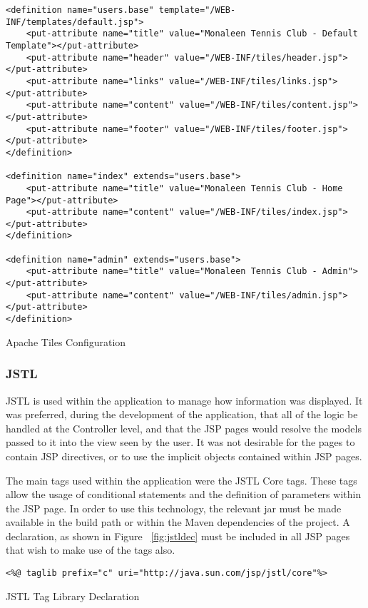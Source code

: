 \begin{table}[H]
\begin{lstlisting}
<definition name="users.base" template="/WEB-INF/templates/default.jsp">
	<put-attribute name="title" value="Monaleen Tennis Club - Default Template"></put-attribute>
	<put-attribute name="header" value="/WEB-INF/tiles/header.jsp"></put-attribute>
	<put-attribute name="links" value="/WEB-INF/tiles/links.jsp"></put-attribute>
	<put-attribute name="content" value="/WEB-INF/tiles/content.jsp"></put-attribute>
	<put-attribute name="footer" value="/WEB-INF/tiles/footer.jsp"></put-attribute>
</definition>

<definition name="index" extends="users.base">
	<put-attribute name="title" value="Monaleen Tennis Club - Home Page"></put-attribute>
	<put-attribute name="content" value="/WEB-INF/tiles/index.jsp"></put-attribute>
</definition>

<definition name="admin" extends="users.base">
	<put-attribute name="title" value="Monaleen Tennis Club - Admin"></put-attribute>
	<put-attribute name="content" value="/WEB-INF/tiles/admin.jsp"></put-attribute>
</definition>
\end{lstlisting}
\caption{Apache Tiles Configuration}
\label{fig:tilesConfig}
\end{table}

\subsubsection{JSTL}

JSTL is used within the application to manage how information was displayed. It was preferred, during the development of the application, that all of the logic be handled at the Controller level, and that the JSP pages would resolve the models passed to it into the view seen by the user. It was not desirable for the pages to contain JSP directives, or to use the implicit objects contained within JSP pages. 

The main tags used within the application were the JSTL Core tags.  These tags allow the usage of conditional statements and the definition of parameters within the JSP page. In order to use this technology, the relevant jar must be made available in the build path or within the Maven dependencies of the project. A declaration, as shown in Figure ~\ref{fig:jstldec} must be included in all JSP pages that wish to make use of the tags also.\newline

\begin{table}[H]
\begin{lstlisting}
<%@ taglib prefix="c" uri="http://java.sun.com/jsp/jstl/core"%>
\end{lstlisting}
\caption{JSTL Tag Library Declaration}
\label{fig:jstldec}
\end{table}


